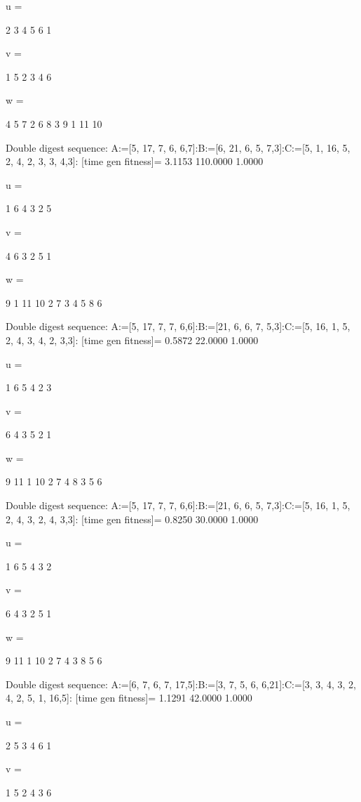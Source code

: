 u =

     2     3     4     5     6     1


v =

     1     5     2     3     4     6


w =

     4     5     7     2     6     8     3     9     1    11    10

Double digest sequence:
A:=[5, 17, 7, 6, 6,7]:B:=[6, 21, 6, 5, 7,3]:C:=[5, 1, 16, 5, 2, 4, 2, 3, 3, 4,3]:
[time gen fitness]=
    3.1153  110.0000    1.0000


u =

     1     6     4     3     2     5


v =

     4     6     3     2     5     1


w =

     9     1    11    10     2     7     3     4     5     8     6

Double digest sequence:
A:=[5, 17, 7, 7, 6,6]:B:=[21, 6, 6, 7, 5,3]:C:=[5, 16, 1, 5, 2, 4, 3, 4, 2, 3,3]:
[time gen fitness]=
    0.5872   22.0000    1.0000


u =

     1     6     5     4     2     3


v =

     6     4     3     5     2     1


w =

     9    11     1    10     2     7     4     8     3     5     6

Double digest sequence:
A:=[5, 17, 7, 7, 6,6]:B:=[21, 6, 6, 5, 7,3]:C:=[5, 16, 1, 5, 2, 4, 3, 2, 4, 3,3]:
[time gen fitness]=
    0.8250   30.0000    1.0000


u =

     1     6     5     4     3     2


v =

     6     4     3     2     5     1


w =

     9    11     1    10     2     7     4     3     8     5     6

Double digest sequence:
A:=[6, 7, 6, 7, 17,5]:B:=[3, 7, 5, 6, 6,21]:C:=[3, 3, 4, 3, 2, 4, 2, 5, 1, 16,5]:
[time gen fitness]=
    1.1291   42.0000    1.0000


u =

     2     5     3     4     6     1


v =

     1     5     2     4     3     6


